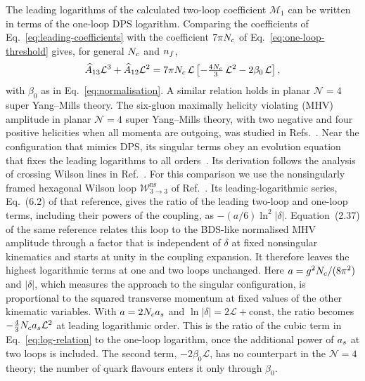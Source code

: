 The leading logarithms of the calculated two-loop coefficient $\mathcal M_1$ can be written in terms of the one-loop DPS logarithm. Comparing the coefficients of Eq.~\eqref{eq:leading-coefficients} with the coefficient $7\pi N_c$ of Eq.~\eqref{eq:one-loop-threshold} gives, for general $N_c$ and $n_f$,
\begin{equation}
 \widehat A_{13}\mathcal L^3+\widehat A_{12}\mathcal L^2
 =7\pi N_c\,\mathcal L\left[- \tfrac{4 N_c}{3}\,\mathcal L^2-2\beta_0\,\mathcal L\right],
 \label{eq:log-relation}
\end{equation}
with $\beta_0$ as in Eq.~\eqref{eq:normalisation}.
A similar relation holds in planar $\mathcal N=4$ super Yang--Mills theory.
The six-gluon maximally helicity violating (MHV) amplitude in planar \(\mathcal N=4\) super Yang--Mills theory, with two negative and four positive helicities when all momenta are outgoing, was studied in Refs.~\cite{DixonEsterlis2016,DixonEsterlis2016Erratum}.
Near the configuration that mimics DPS, its singular terms obey an evolution equation that fixes the leading logarithms to all orders~\cite{DixonEsterlis2016,DixonEsterlis2016Erratum}. Its derivation follows the analysis of crossing Wilson lines in Ref.~\cite{KorchemskayaKorchemsky1995}.
For this comparison we use the nonsingularly framed hexagonal
Wilson loop $\mathcal W^{\mathrm{ns}}_{3\to3}$ of
Ref.~\cite{DixonEsterlis2016}. Its leading-logarithmic series,
Eq.~(6.2) of that reference, gives the ratio of the leading
two-loop and one-loop terms, including their powers of the
coupling, as $-(a/6)\ln^2|\delta|$.
Equation~(2.37) of the same reference relates this loop to the
BDS-like normalised MHV amplitude through a factor that is
independent of $\delta$ at fixed nonsingular kinematics and
starts at unity in the coupling expansion. It therefore leaves
the highest logarithmic terms at one and two loops unchanged.
Here $a=g^2N_c/(8\pi^2)$ and $|\delta|$, which measures the
approach to the singular configuration, is proportional to
the squared transverse momentum at fixed values of the other
kinematic variables. With $a=2N_ca_s$ and
$\ln|\delta|=2\mathcal L+\mathrm{const}$, the ratio becomes
$-\tfrac43N_ca_s\mathcal L^2$ at leading logarithmic order.
This is the ratio of the cubic term in
Eq.~\eqref{eq:log-relation} to the one-loop logarithm, once the
additional power of $a_s$ at two loops is included.
The second term, $-2\beta_0\mathcal L$, has no counterpart in the
$\mathcal N=4$ theory; the number of quark
flavours enters it only through $\beta_0$.

